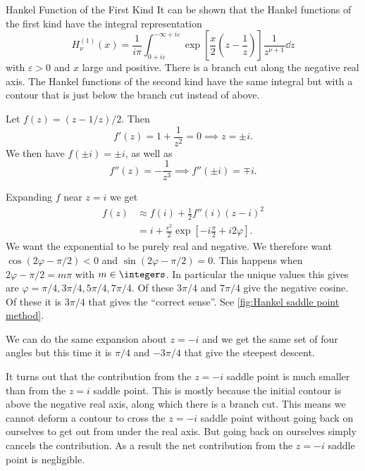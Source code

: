 \documentclass[fleqn]{NotesClass}
\begin{document}
    \begin{exm}{Hankel Function of the First Kind}{}
        It can be shown that the Hankel functions of the first kind have the integral representation
        \begin{equation}
            H_\nu^{(1)}(x) = \frac{1}{i\pi} \int_{0 + i\varepsilon}^{-\infty + i\varepsilon} \exp\left[ \frac{x}{2}\left( z - \frac{1}{z} \right) \right] \frac{1}{z^{\nu + 1}}\dd{z}
        \end{equation}
        with \(\varepsilon > 0\) and \(x\) large and positive.
        There is a branch cut along the negative real axis.
        The Hankel functions of the second kind have the same integral but with a contour that is just below the branch cut instead of above.
        
        Let \(f(z) = (z - 1/z)/2\).
        Then
        \begin{equation}
            f'(z) = 1 + \frac{1}{z^2} = 0 \implies z = \pm i.
        \end{equation}
        We then have \(f(\pm i) = \pm i\), as well as
        \begin{equation}
            f''(z) = -\frac{1}{z^3} \implies f''(\pm i) = \mp i.
        \end{equation}
        
        Expanding \(f\) near \(z = i\) we get
        \begin{align}
            f(z) &\approx f(i) + \frac{1}{2}f''(i)(z - i)^2\\
            &= i + \frac{r^2}{2}\exp\left[ -i\frac{\pi}{2} + i2\varphi \right].
        \end{align}
        We want the exponential to be purely real and negative.
        We therefore want \(\cos(2\varphi - \pi/2)  < 0\) and \(\sin(2\varphi - \pi/2) = 0\).
        This happens when \(2\varphi - \pi/2 = m\pi\) with \(m\in\integers\).
        In particular the unique values this gives are \(\varphi = \pi/4, 3\pi/4, 5\pi/4, 7\pi/4\).
        Of these \(3\pi/4\) and \(7\pi/4\) give the negative cosine.
        Of these it is \(3\pi/4\) that gives the \enquote{correct sense}.
        See \cref{fig:Hankel saddle point method}.
        
        We can do the same expansion about \(z = -i\) and we get the same set of four angles but this time it is \(\pi/4\) and \(-3\pi/4\) that give the steepest descent.
        
        It turns out that the contribution from the \(z = -i\) saddle point is much smaller than from the \(z = i\) saddle point.
        This is mostly because the initial contour is above the negative real axis, along which there is a branch cut.
        This means we cannot deform a contour to cross the \(z = -i\) saddle point without going back on ourselves to get out from under the real axis.
        But going back on ourselves simply cancels the contribution.
        As a result the net contribution from the \(z = -i\) saddle point is negligible.
        

\end{exm}
\end{document}
